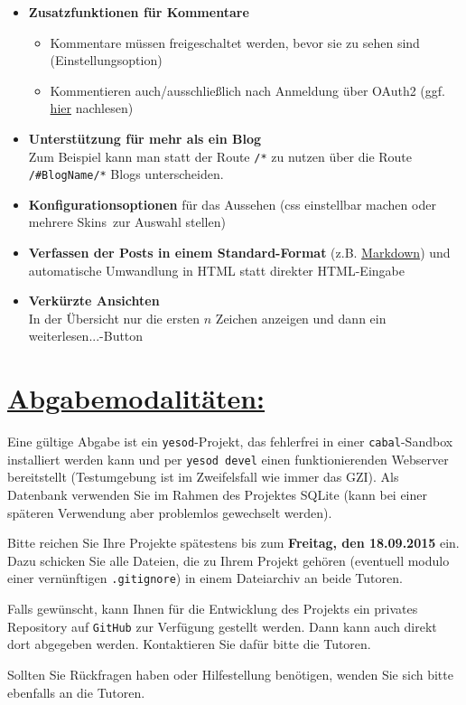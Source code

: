 \documentclass[10pt,a4paper]{article}
\begin{document}
\begin{itemize}
 \item \textbf{Zusatzfunktionen für Kommentare}
       \begin{itemize}
        \item Kommentare müssen freigeschaltet werden, bevor sie zu sehen sind (Einstellungsoption)
        \item Kommentieren auch/ausschließlich nach Anmeldung über OAuth2 (ggf. \href{https://github.com/thoughtbot/yesod-auth-oauth2}{hier} nachlesen)
       \end{itemize}
 \item \textbf{Unterstützung für mehr als ein Blog}\\
       Zum Beispiel kann man statt der Route \texttt{/*} zu nutzen über die Route \texttt{/\#BlogName/*} Blogs unterscheiden.
 \item \textbf{Konfigurationsoptionen} für das Aussehen (css einstellbar machen oder mehrere \glqq Skins\grqq \ zur Auswahl stellen)
 \item \textbf{Verfassen der Posts in einem Standard-Format} (z.B. \href{https://hackage.haskell.org/package/pandoc}{Markdown}) und automatische Umwandlung in HTML statt direkter HTML-Eingabe
 \item \textbf{Verkürzte Ansichten}\\ In der Übersicht nur die ersten $n$ Zeichen anzeigen und dann ein \glqq weiterlesen...\grqq-Button
\end{itemize}

\section*{\underline{Abgabemodalitäten:}}

Eine gültige Abgabe ist ein \texttt{yesod}-Projekt, das fehlerfrei in einer \texttt{cabal}-Sandbox installiert werden kann und per \texttt{yesod devel} einen funktionierenden Webserver bereitstellt (Testumgebung ist im Zweifelsfall wie immer das GZI). Als Datenbank verwenden Sie im Rahmen des Projektes SQLite (kann bei einer späteren Verwendung aber problemlos gewechselt werden).

Bitte reichen Sie Ihre Projekte spätestens bis zum \textbf{Freitag, den 18.09.2015} ein.
Dazu schicken Sie alle Dateien, die zu Ihrem Projekt gehören (eventuell modulo einer vernünftigen \texttt{.gitignore}) in einem Dateiarchiv an beide Tutoren.\bigskip

Falls gewünscht, kann Ihnen für die Entwicklung des Projekts ein privates Repository auf \texttt{GitHub} zur Verfügung gestellt werden. Dann kann auch direkt dort abgegeben werden. Kontaktieren Sie dafür bitte die Tutoren.\bigskip

Sollten Sie Rückfragen haben oder Hilfestellung benötigen, wenden Sie sich bitte ebenfalls an die Tutoren.
\end{document}
